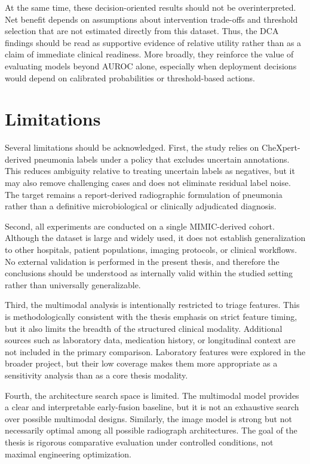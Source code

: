 At the same time, these decision-oriented results should not be overinterpreted. Net benefit depends on assumptions about intervention trade-offs and threshold selection that are not estimated directly from this dataset. Thus, the DCA findings should be read as supportive evidence of relative utility rather than as a claim of immediate clinical readiness. More broadly, they reinforce the value of evaluating models beyond AUROC alone, especially when deployment decisions would depend on calibrated probabilities or threshold-based actions.

\section{Limitations}

Several limitations should be acknowledged. First, the study relies on CheXpert-derived pneumonia labels under a policy that excludes uncertain annotations. This reduces ambiguity relative to treating uncertain labels as negatives, but it may also remove challenging cases and does not eliminate residual label noise. The target remains a report-derived radiographic formulation of pneumonia rather than a definitive microbiological or clinically adjudicated diagnosis.

Second, all experiments are conducted on a single MIMIC-derived cohort. Although the dataset is large and widely used, it does not establish generalization to other hospitals, patient populations, imaging protocols, or clinical workflows. No external validation is performed in the present thesis, and therefore the conclusions should be understood as internally valid within the studied setting rather than universally generalizable.

Third, the multimodal analysis is intentionally restricted to triage features. This is methodologically consistent with the thesis emphasis on strict feature timing, but it also limits the breadth of the structured clinical modality. Additional sources such as laboratory data, medication history, or longitudinal context are not included in the primary comparison. Laboratory features were explored in the broader project, but their low coverage makes them more appropriate as a sensitivity analysis than as a core thesis modality.

Fourth, the architecture search space is limited. The multimodal model provides a clear and interpretable early-fusion baseline, but it is not an exhaustive search over possible multimodal designs. Similarly, the image model is strong but not necessarily optimal among all possible radiograph architectures. The goal of the thesis is rigorous comparative evaluation under controlled conditions, not maximal engineering optimization.

